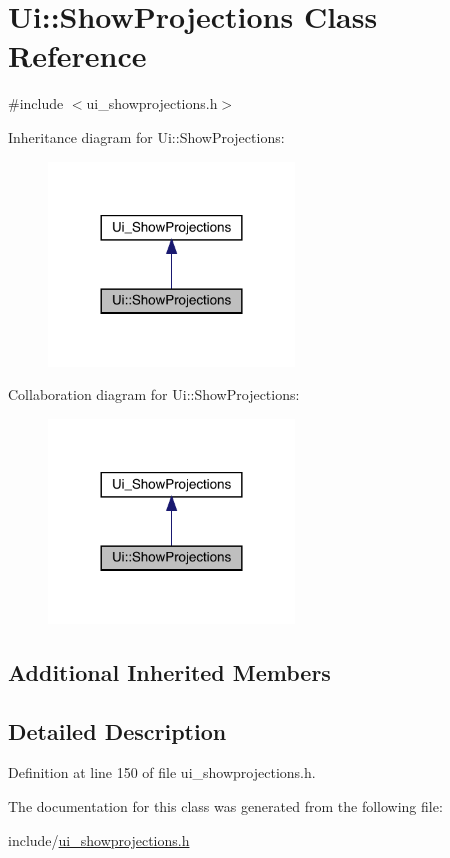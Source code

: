 \hypertarget{class_ui_1_1_show_projections}{}\section{Ui\+:\+:Show\+Projections Class Reference}
\label{class_ui_1_1_show_projections}


{\ttfamily \#include $<$ui\+\_\+showprojections.\+h$>$}



Inheritance diagram for Ui\+:\+:Show\+Projections\+:
\nopagebreak
\begin{figure}[H]
\begin{center}
\leavevmode
\includegraphics[width=185pt]{class_ui_1_1_show_projections__inherit__graph}
\end{center}
\end{figure}


Collaboration diagram for Ui\+:\+:Show\+Projections\+:
\nopagebreak
\begin{figure}[H]
\begin{center}
\leavevmode
\includegraphics[width=185pt]{class_ui_1_1_show_projections__coll__graph}
\end{center}
\end{figure}
\subsection*{Additional Inherited Members}


\subsection{Detailed Description}


Definition at line 150 of file ui\+\_\+showprojections.\+h.



The documentation for this class was generated from the following file\+:\begin{DoxyCompactItemize}
\item 
include/\mbox{\hyperlink{ui__showprojections_8h}{ui\+\_\+showprojections.\+h}}\end{DoxyCompactItemize}
